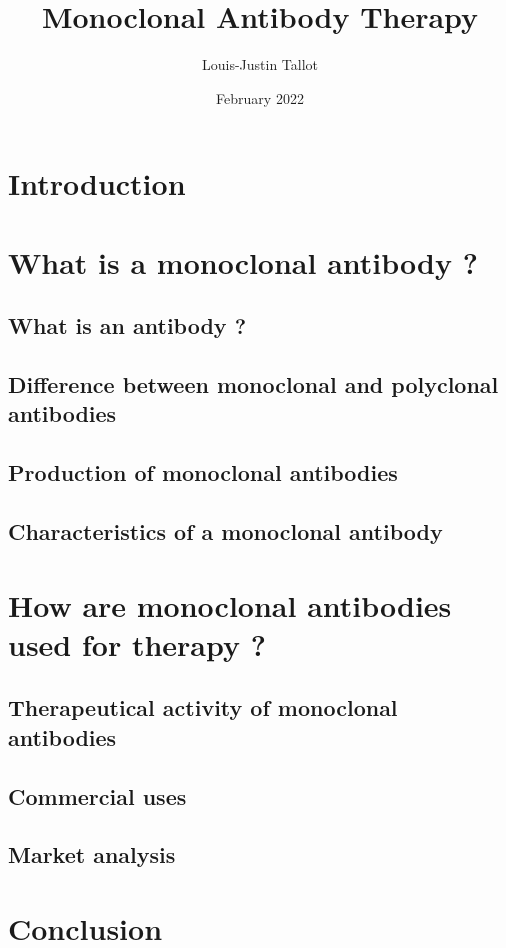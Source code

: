 \documentclass{article}
\title{
  \textbf{Monoclonal Antibody Therapy}
}
\author{Louis-Justin Tallot}
\date{February 2022}
\begin{document}
  \maketitle

  \section*{Introduction}
  

  \section{What is a monoclonal antibody ?}

    \subsection{What is an antibody ?}

    \subsection{Difference between monoclonal and polyclonal antibodies}

    \subsection{Production of monoclonal antibodies}

    \subsection{Characteristics of a monoclonal antibody}

  \section{How are monoclonal antibodies used for therapy ?}

    \subsection{Therapeutical activity of monoclonal antibodies}

    \subsection{Commercial uses}

    \subsection{Market analysis}
    
  
  \section*{Conclusion}


  \printbibliography
\end{document}
